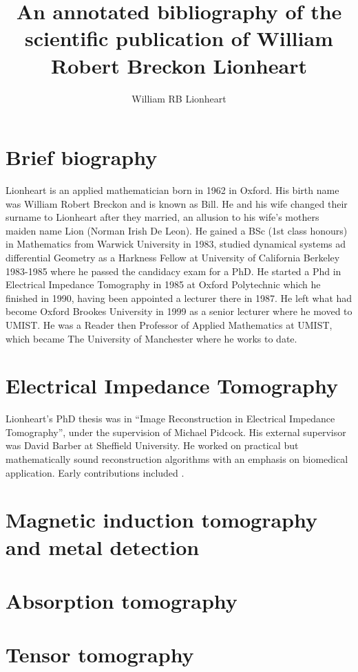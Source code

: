 \documentclass[]{article}
\title{An annotated bibliography of the  scientific publication of William Robert Breckon Lionheart}
\author{William RB Lionheart}
\begin{document}
\maketitle


\section{Brief biography}
Lionheart is an applied mathematician born in 1962 in Oxford. His birth name was William Robert Breckon and is known as Bill. He and his wife changed their surname to Lionheart after they married, an allusion to his wife's mothers maiden name Lion (Norman Irish De Leon).  He gained a BSc (1st class honours) in Mathematics from Warwick University in 1983, studied dynamical systems ad differential Geometry as a Harkness Fellow at University of California Berkeley 1983-1985 where he passed the candidacy exam for a PhD. He started a Phd in Electrical Impedance Tomography in 1985 at Oxford Polytechnic which he finished in 1990, having been appointed a lecturer there in 1987.  He left what had become Oxford Brookes University in 1999 as a senior lecturer where he moved to UMIST. He was a Reader then Professor of Applied Mathematics at UMIST, which became The University of Manchester where he works to date.

\section{Electrical Impedance Tomography}

Lionheart's PhD thesis was in ``Image Reconstruction in Electrical Impedance Tomography''\cite{breckon1990image}, under the supervision of Michael Pidcock. His external supervisor was David Barber at Sheffield University. He worked on practical but mathematically sound reconstruction algorithms with an emphasis on biomedical application. Early contributions included \cite{breckon1988ill} \cite{breckon1988progress} \cite{breckon1988data}.


\section{Magnetic induction tomography and metal detection}

\section{Absorption tomography}

\section{Tensor tomography}
\end{document}
